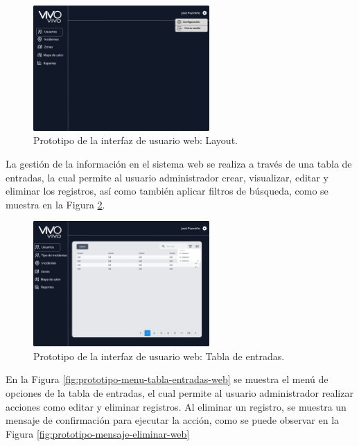 \begin{figure}[H]
    \centering
    \includegraphics[width=0.6\textwidth]{chapters/III-resultados-y-discusion/resources/images/prototipo-layout-web.png}
    \caption{Prototipo de la interfaz de usuario web: Layout.}
    \label{fig:prototipo-layout-web}
\end{figure}

La gestión de la información en el sistema web se realiza a través de una tabla de entradas, la cual permite al usuario administrador crear, visualizar,
editar y eliminar los registros, así como también aplicar filtros de búsqueda, como se muestra en la Figura \ref{fig:prototipo-tabla-entradas-web}.

\begin{figure}[H]
    \centering
    \includegraphics[width=0.6\textwidth]{chapters/III-resultados-y-discusion/resources/images/prototipo-tabla-entradas-web.png}
    \caption{Prototipo de la interfaz de usuario web: Tabla de entradas.}
    \label{fig:prototipo-tabla-entradas-web}
\end{figure}

En la Figura \ref{fig:prototipo-menu-tabla-entradas-web} se muestra el menú de opciones de la tabla de entradas, el cual permite al usuario administrador
realizar acciones como editar y eliminar registros. Al eliminar un registro, se muestra un mensaje de confirmación para ejecutar la acción, como se puede
observar en la Figura \ref{fig:prototipo-mensaje-eliminar-web}

